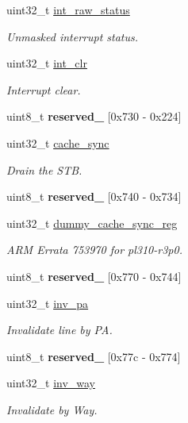 \begin{DoxyCompactItemize}
uint32\+\_\+t \mbox{\hyperlink{group__L2C-310__cache_gadf6b5a062dcd4564befd4c87b31e9096}{int\+\_\+raw\+\_\+status}}
\begin{DoxyCompactList}\small\item\em Unmasked interrupt status. \end{DoxyCompactList}\item 
uint32\+\_\+t \mbox{\hyperlink{group__L2C-310__cache_gaf594905376998ae1b21e7d01e273c11c}{int\+\_\+clr}}
\begin{DoxyCompactList}\small\item\em Interrupt clear. \end{DoxyCompactList}\item 
uint8\+\_\+t {\bfseries reserved\+\_} \mbox{[}0x730 -\/ 0x224\mbox{]}
\item 
uint32\+\_\+t \mbox{\hyperlink{group__L2C-310__cache_ga303119e21f6e6fd7d5026b3db7cbbdd6}{cache\+\_\+sync}}
\begin{DoxyCompactList}\small\item\em Drain the S\+TB. \end{DoxyCompactList}\item 
uint8\+\_\+t {\bfseries reserved\+\_} \mbox{[}0x740 -\/ 0x734\mbox{]}
\item 
uint32\+\_\+t \mbox{\hyperlink{group__L2C-310__cache_ga36cd1592fd2c87b1c90d03d2bb2e946d}{dummy\+\_\+cache\+\_\+sync\+\_\+reg}}
\begin{DoxyCompactList}\small\item\em A\+RM Errata 753970 for pl310-\/r3p0. \end{DoxyCompactList}\item 
uint8\+\_\+t {\bfseries reserved\+\_} \mbox{[}0x770 -\/ 0x744\mbox{]}
\item 
uint32\+\_\+t \mbox{\hyperlink{group__L2C-310__cache_ga30a718a7bfad6c71dea00321954187a8}{inv\+\_\+pa}}
\begin{DoxyCompactList}\small\item\em Invalidate line by PA. \end{DoxyCompactList}\item 
uint8\+\_\+t {\bfseries reserved\+\_} \mbox{[}0x77c -\/ 0x774\mbox{]}
\item 
uint32\+\_\+t \mbox{\hyperlink{group__L2C-310__cache_ga9ef4dc6545a03aeaca3f760e596a9f54}{inv\+\_\+way}}
\begin{DoxyCompactList}\small\item\em Invalidate by Way. \end{DoxyCompactList}\item 

\end{DoxyCompactItemize}
